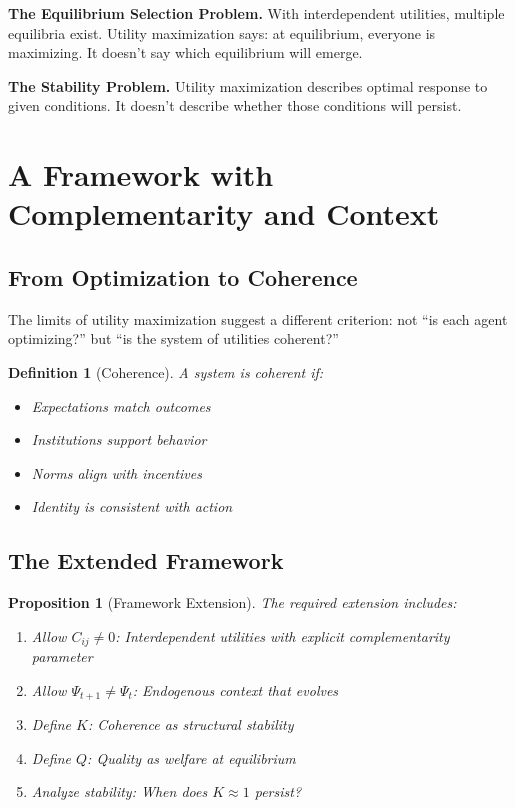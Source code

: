 \documentclass[12pt]{article}
\newtheorem{proposition}{Proposition}
\newtheorem{definition}{Definition}
\begin{document}
\textbf{The Equilibrium Selection Problem.} With interdependent utilities, multiple equilibria exist. Utility maximization says: at equilibrium, everyone is maximizing. It doesn't say which equilibrium will emerge.

\textbf{The Stability Problem.} Utility maximization describes optimal response to given conditions. It doesn't describe whether those conditions will persist.



\section{A Framework with Complementarity and Context}
\label{sec:framework}

\subsection{From Optimization to Coherence}

The limits of utility maximization suggest a different criterion: not ``is each agent optimizing?'' but ``is the system of utilities coherent?''

\begin{definition}[Coherence]
A system is coherent if:
\begin{itemize}
    \item Expectations match outcomes
    \item Institutions support behavior
    \item Norms align with incentives
    \item Identity is consistent with action
\end{itemize}
\end{definition}

\subsection{The Extended Framework}

\begin{proposition}[Framework Extension]
The required extension includes:
\begin{enumerate}
    \item Allow $C_{ij} \neq 0$: Interdependent utilities with explicit complementarity parameter
    \item Allow $\Psi_{t+1} \neq \Psi_t$: Endogenous context that evolves
    \item Define $K$: Coherence as structural stability
    \item Define $Q$: Quality as welfare at equilibrium
    \item Analyze stability: When does $K \approx 1$ persist?
\end{enumerate}
\end{proposition}
\end{document}
